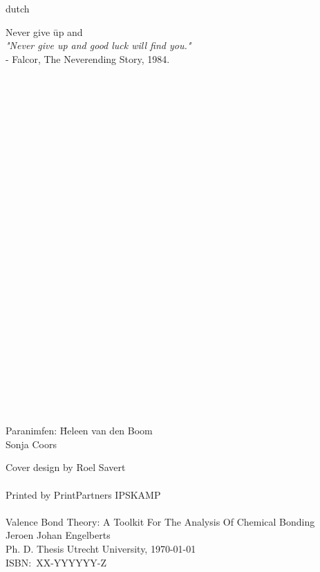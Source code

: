 \begin{otherlanguage*}{dutch}
\newpage
\raggedright
\noindent
\begin{tabbing}
Never give \= up and \kill\\
\textit{"Never give up and good luck will find you."}\\
\> - Falcor, The Neverending Story, 1984.
\end{tabbing}
\mbox{ }\\
\mbox{ }\\
\mbox{ }\\
\mbox{ }\\
\mbox{ }\\
\mbox{ }\\
\mbox{ }\\
\mbox{ }\\
\mbox{ }\\
\mbox{ }\\
\mbox{ }\\
\mbox{ }\\
\mbox{ }\\
\mbox{ }\\
\mbox{ }\\
\mbox{ }\\
\mbox{ }\\
\mbox{ }\\
\mbox{ }\\
\mbox{ }\\
\mbox{ }\\
\mbox{ }\\
\mbox{ }\\
\mbox{ }\\
\mbox{ }\\
\begin{tabbing}
Paranimfen: \=Heleen van den Boom\\
            \>Sonja Coors
\end{tabbing}
\end{otherlanguage*}
Cover design by Roel Savert\\
\mbox{ }\\
Printed by PrintPartners IPSKAMP\\
\mbox{ }\\
Valence Bond Theory: A Toolkit For The Analysis Of Chemical Bonding\\
Jeroen Johan Engelberts\\
Ph. D. Thesis Utrecht University, \today \\
ISBN:~XX-YYYYYY-Z
\newpage

\tableofcontents

\mainmatter \pagestyle{fancy}

